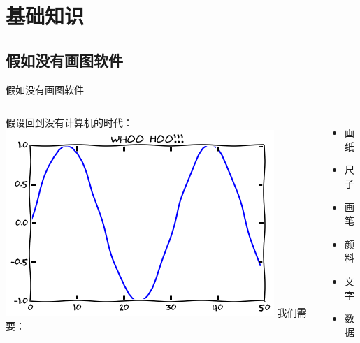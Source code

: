 \documentclass[UTF8, 11pt]{ctexbeamer}
\begin{document}
\section{基础知识}
\subsection{假如没有画图软件}
\begin{frame}{假如没有画图软件}
\begin{columns}
假设回到没有计算机的时代：
\centering
\includegraphics[width=\textwidth]{handy_plot}
\pause
{}
我们需要：
\begin{itemize}
\item 画纸
\item 尺子
\item 画笔
\item 颜料
\item 文字
\item 数据
\end{itemize}
\end{columns}
\end{frame}
\end{document}
